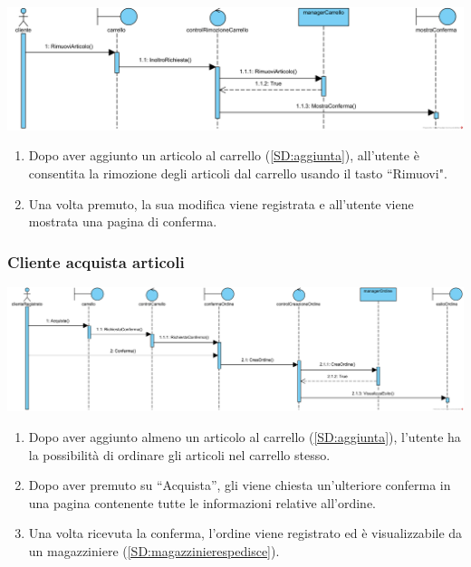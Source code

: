 \documentclass[12pt,a4paper]{article}
\begin{document}
\begin{center}
\includegraphics[width=\textwidth]{SequenceDiagram/ClienteCarrelloRimuove}
\end{center}

\begin{enumerate}
\item Dopo aver aggiunto un articolo al carrello (\ref{SD:aggiunta}), all'utente è consentita la rimozione degli articoli dal carrello usando il tasto ``Rimuovi".
\item Una volta premuto, la sua modifica viene registrata e all'utente viene mostrata una pagina di conferma.
\end{enumerate}

\newpage

\subsubsection{Cliente acquista articoli}
\label{SD:acquista}

\begin{center}
\includegraphics[width=\textwidth]{SequenceDiagram/ClienteArticoloAcquista}
\end{center}

\begin{enumerate}
\item Dopo aver aggiunto almeno un articolo al carrello (\ref{SD:aggiunta}), l'utente ha la possibilità di ordinare gli articoli nel carrello stesso.
\item Dopo aver premuto su ``Acquista'', gli viene chiesta un'ulteriore conferma in una pagina contenente tutte le informazioni relative all'ordine.
\item Una volta ricevuta la conferma, l'ordine viene registrato ed è visualizzabile da un magazziniere  (\ref{SD:magazzinierespedisce}).
\end{enumerate}
\end{document}
